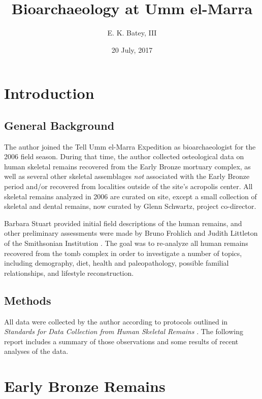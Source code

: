 \documentclass[]{book}
\title{Bioarchaeology at Umm el-Marra}
\author{E. K. Batey, III}
\date{20 July, 2017}
\begin{document}
\maketitle

{
\setcounter{tocdepth}{1}
\tableofcontents
}
\chapter{Introduction}\label{intro}

\section{General Background}\label{general-background}

The author joined the Tell Umm el-Marra Expedition as bioarchaeologist
for the 2006 field season. During that time, the author collected
osteological data on human skeletal remains recovered from the Early
Bronze mortuary complex, as well as several other skeletal assemblages
\emph{not} associated with the Early Bronze period and/or recovered from
localities outside of the site's acropolis center. All skeletal remains
analyzed in 2006 are curated on site, except a small collection of
skeletal and dental remains, now curated by Glenn Schwartz, project
co-director.

Barbara Stuart provided initial field descriptions of the human remains,
and other preliminary assessments were made by Bruno Frohlich and Judith
Littleton of the Smithsonian Institution \citep{schwartz2007hidden}. The
goal was to re-analyze all human remains recovered from the tomb complex
in order to investigate a number of topics, including demography, diet,
health and paleopathology, possible familial relationships, and
lifestyle reconstruction.

\section{Methods}\label{methods}

All data were collected by the author according to protocols outlined in
\emph{Standards for Data Collection from Human Skeletal Remains}
\citep{standards1994}. The following report includes a summary of those
observations and some results of recent analyses of the data.

\chapter{Early Bronze Remains}\label{earlybronze}
\end{document}
